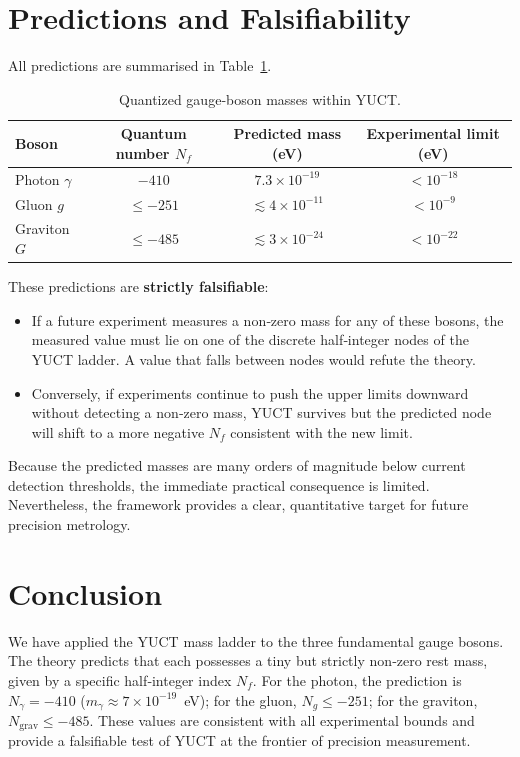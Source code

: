 \documentclass[12pt,a4paper]{article}
\begin{document}
	\section{Predictions and Falsifiability}
	
	All predictions are summarised in Table~\ref{tab:predictions}.
	
	\begin{table}[H]
		\centering
		\caption{Quantized gauge‑boson masses within YUCT.}
		\label{tab:predictions}
		\begin{tabular}{lccc}
			\toprule
			\textbf{Boson} & \textbf{Quantum number $N_f$} & \textbf{Predicted mass (eV)} & \textbf{Experimental limit (eV)} \\
			\midrule
			Photon   $\gamma$ & $-410$ & $7.3 \times 10^{-19}$ & $< 10^{-18}$ \\
			Gluon    $g$      & $\le -251$ & $\lesssim 4 \times 10^{-11}$ & $< 10^{-9}$ \\
			Graviton $G$      & $\le -485$ & $\lesssim 3 \times 10^{-24}$ & $< 10^{-22}$ \\
			\bottomrule
		\end{tabular}
	\end{table}
	
	These predictions are \textbf{strictly falsifiable}:
	\begin{itemize}
		\item If a future experiment measures a non‑zero mass for any of these bosons, the
		measured value must lie on one of the discrete half‑integer nodes of the YUCT
		ladder.  A value that falls between nodes would refute the theory.
		\item Conversely, if experiments continue to push the upper limits downward without
		detecting a non‑zero mass, YUCT survives but the predicted node will shift to a
		more negative $N_f$ consistent with the new limit.
	\end{itemize}
	
	Because the predicted masses are many orders of magnitude below current detection
	thresholds, the immediate practical consequence is limited.  Nevertheless, the
	framework provides a clear, quantitative target for future precision metrology.
	
	\section{Conclusion}
	
	We have applied the YUCT mass ladder to the three fundamental gauge bosons.  The
	theory predicts that each possesses a tiny but strictly non‑zero rest mass, given
	by a specific half‑integer index $N_f$.  For the photon, the prediction is
	$N_\gamma = -410$ ($m_\gamma \approx 7\times 10^{-19}$~eV); for the gluon,
	$N_g \le -251$; for the graviton, $N_{\mathrm{grav}} \le -485$.  These values
	are consistent with all experimental bounds and provide a falsifiable test of
	YUCT at the frontier of precision measurement.
	
\end{document}
